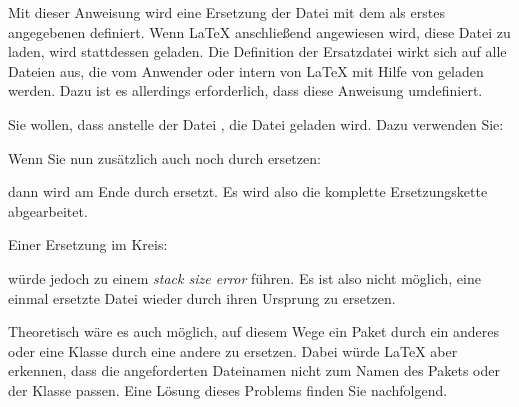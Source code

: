 \begin{Declaration}
\end{Declaration}
Mit dieser Anweisung wird eine Ersetzung
der Datei mit dem als erstes angegebenen  definiert. Wenn
\LaTeX{} anschließend angewiesen wird, diese Datei zu laden, wird stattdessen
 geladen. Die Definition der Ersatzdatei wirkt sich auf
alle Dateien aus, die vom Anwender oder intern von \LaTeX{} mit Hilfe von
 geladen werden. Dazu ist es allerdings erforderlich,
dass  diese Anweisung umdefiniert.

\begin{Example}
  Sie wollen, dass anstelle der Datei , die Datei
   geladen wird. Dazu verwenden Sie:
\begin{lstcode}
\end{lstcode}
  Wenn Sie nun zusätzlich  auch noch durch
   ersetzen:
\begin{lstcode}
\end{lstcode}
  dann wird  am Ende durch
   ersetzt. Es wird also die komplette
  Ersetzungskette abgearbeitet.

  Einer Ersetzung im Kreis:
\begin{lstcode}
\end{lstcode}
  würde jedoch zu einem \emph{stack size error} führen. Es ist also nicht
  möglich, eine einmal ersetzte Datei wieder durch ihren Ursprung zu ersetzen.
\end{Example}

Theoretisch wäre es auch möglich, auf diesem Wege ein Paket durch ein anderes
oder eine Klasse durch eine andere zu ersetzen. Dabei würde \LaTeX{} aber
erkennen, dass die angeforderten Dateinamen nicht zum Namen des Pakets oder
der Klasse passen. Eine Lösung dieses Problems finden Sie nachfolgend.
%
\EndIndexGroup


